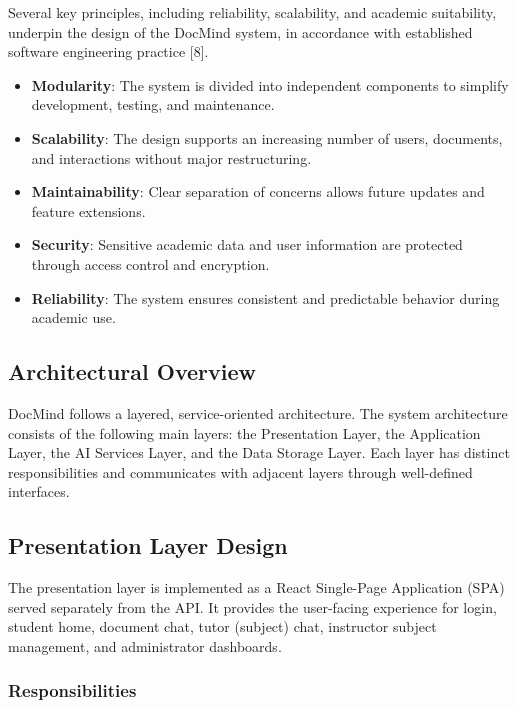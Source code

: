 \documentclass[12pt, a4paper, oneside]{report}
\let\oldsubsection\subsection
\renewcommand{\subsection}{%
  \addtocontents{toc}{\protect\needspace{3\baselineskip}}%
  \oldsubsection
}
\begin{document}
Several key principles, including reliability, scalability, and academic suitability, underpin the design of the DocMind system, in accordance with established software engineering practice [8].

\begin{itemize}
  \item \textbf{Modularity}: The system is divided into independent components to simplify development, testing, and maintenance.
  \item \textbf{Scalability}: The design supports an increasing number of users, documents, and interactions without major restructuring.
  \item \textbf{Maintainability}: Clear separation of concerns allows future updates and feature extensions.
  \item \textbf{Security}: Sensitive academic data and user information are protected through access control and encryption.
  \item \textbf{Reliability}: The system ensures consistent and predictable behavior during academic use.
\end{itemize}

\subsection{Architectural Overview}

DocMind follows a layered, service-oriented architecture. The system architecture consists of the following main layers: the Presentation Layer, the Application Layer, the AI Services Layer, and the Data Storage Layer. Each layer has distinct responsibilities and communicates with adjacent layers through well-defined interfaces.

\newpage

\subsection{Presentation Layer Design}

The presentation layer is implemented as a React Single-Page Application (SPA) served separately from the API. It provides the user-facing experience for login, student home, document chat, tutor (subject) chat, instructor subject management, and administrator dashboards.

\subsubsection{Responsibilities}
\end{document}
